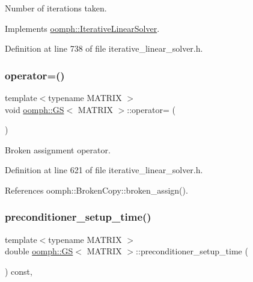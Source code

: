 Number of iterations taken. 



Implements \hyperlink{classoomph_1_1IterativeLinearSolver_a5fe7f7b5e4847fdbd4f95d3875ec7a46}{oomph\+::\+Iterative\+Linear\+Solver}.



Definition at line 738 of file iterative\+\_\+linear\+\_\+solver.\+h.

\mbox{\label{classoomph_1_1GS_af277c6797d99305c7195e40f93bab824}} 
\subsubsection{\texorpdfstring{operator=()}{operator=()}}
{\footnotesize\ttfamily template$<$typename M\+A\+T\+R\+IX $>$ \\
void \hyperlink{classoomph_1_1GS}{oomph\+::\+GS}$<$ M\+A\+T\+R\+IX $>$\+::operator= (\begin{DoxyParamCaption}\item[{const \hyperlink{classoomph_1_1GS}{GS}$<$ M\+A\+T\+R\+IX $>$ \&}]{ }\end{DoxyParamCaption})\hspace{0.3cm}{\ttfamily [inline]}}



Broken assignment operator. 



Definition at line 621 of file iterative\+\_\+linear\+\_\+solver.\+h.



References oomph\+::\+Broken\+Copy\+::broken\+\_\+assign().

\mbox{\label{classoomph_1_1GS_a5ee0e379319f6919f7ac00a715be72fb}} 
\subsubsection{\texorpdfstring{preconditioner\+\_\+setup\+\_\+time()}{preconditioner\_setup\_time()}}
{\footnotesize\ttfamily template$<$typename M\+A\+T\+R\+IX $>$ \\
double \hyperlink{classoomph_1_1GS}{oomph\+::\+GS}$<$ M\+A\+T\+R\+IX $>$\+::preconditioner\+\_\+setup\+\_\+time (\begin{DoxyParamCaption}{ }\end{DoxyParamCaption}) const\hspace{0.3cm}{\ttfamily [inline]}, {\ttfamily [virtual]}}



